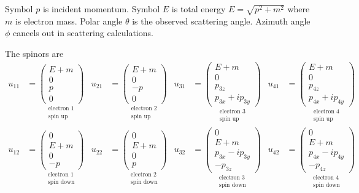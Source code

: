 \documentclass[12pt]{article}
\begin{document}
Symbol $p$ is incident momentum.
Symbol $E$ is total energy $E=\sqrt{p^2+m^2}$ where $m$ is electron mass.
Polar angle $\theta$ is the observed scattering angle.
Azimuth angle $\phi$ cancels out in scattering calculations.

\bigskip
The spinors are
\begin{align*}
u_{11}&=
\underset{\substack{\text{electron 1}\\\text{spin up}}}
{\begin{pmatrix}E+m\\0\\p\\0\end{pmatrix}}
&
u_{21}&=
\underset{\substack{\text{electron 2}\\\text{spin up}}}
{\begin{pmatrix}E+m\\0\\-p\\0\end{pmatrix}}
&
u_{31}&=
\underset{\substack{\text{electron 3}\\\text{spin up}}}
{\begin{pmatrix}E+m\\0\\p_{3z}\\p_{3x}+ip_{3y}\end{pmatrix}}
&
u_{41}&=
\underset{\substack{\text{electron 4}\\\text{spin up}}}
{\begin{pmatrix}E+m\\0\\p_{4z}\\p_{4x}+ip_{4y}\end{pmatrix}}
\\[1ex]
u_{12}&=
\underset{\substack{\text{electron 1}\\\text{spin down}}}
{
\begin{pmatrix}0\\E+m\\0\\-p\end{pmatrix}
}
&
u_{22}&=
\underset{\substack{\text{electron 2}\\\text{spin down}}}
{
\begin{pmatrix}0\\E+m\\0\\p\end{pmatrix}
}
&
u_{32}&=
\underset{\substack{\text{electron 3}\\\text{spin down}}}
{
\begin{pmatrix}0\\E+m\\p_{3x}-ip_{3y}\\-p_{3z}\end{pmatrix}
}
&
u_{42}&=
\underset{\substack{\text{electron 4}\\\text{spin down}}}
{
\begin{pmatrix}0\\E+m\\p_{4x}-ip_{4y}\\-p_{4z}\end{pmatrix}
}
\end{align*}
\end{document}
